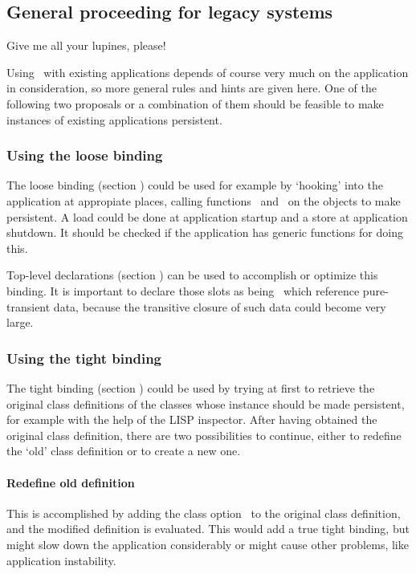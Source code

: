 \subsection{General proceeding for legacy systems}

\begin{fortune}
\hspace*{\fill}Give me all your lupines, please!
\end{fortune}

Using \plob\ with existing applications depends of course very much on
the application in consideration, so more general rules and hints are
given here. One of the following two proposals or a combination of
them should be feasible to make instances of existing applications
persistent.

\subsubsection{Using the loose binding}

The loose binding (section ) could be used
for example by `hooking' into the application at appropiate places,
calling functions \ and \ on
the objects to make persistent. A load could be done at application
startup and a store at application shutdown. It should be checked if
the application has generic functions for doing this.

Top-level declarations (section )
can be used to accomplish or optimize this binding. It is important to
declare those slots as being \ which reference
pure-transient data, because the transitive closure of such data could
become very large.

\subsubsection{Using the tight binding}

The tight binding (section ) could be used
by trying at first to retrieve the original class definitions of the
classes whose instance should be made persistent, for example with the
help of the LISP inspector. After having obtained the original class
definition, there are two possibilities to continue, either to
redefine the `old' class definition or to create a new one.

\paragraph{Redefine old definition} This is accomplished by adding the
class option \ to the
original class definition, and the modified definition is evaluated.
This would add a true tight binding, but might slow down the
application considerably or might cause other problems, like
application instability.

